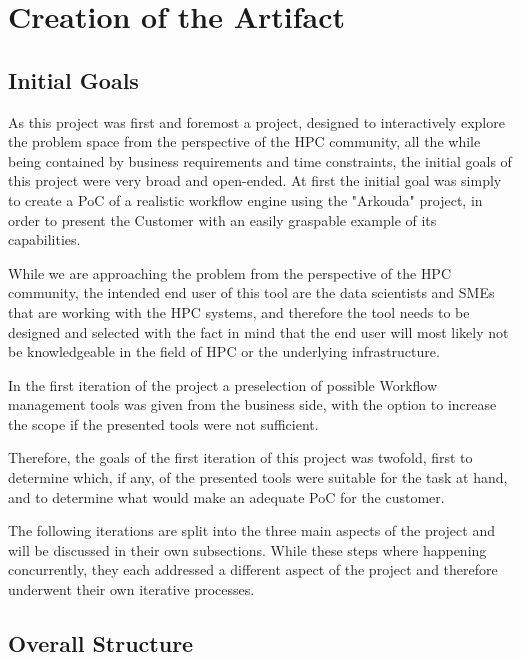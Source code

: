 \chapter{Creation of the Artifact}
\label{creation_of_the_artifact}

\section{Initial Goals}
\label{artefact_inital_goals}

As this project was first and foremost a project, designed to interactively explore the problem space from the perspective of the \ac{HPC} community, 
all the while being contained by business requirements and time constraints, the initial goals of this project were very broad and open-ended. 
At first the initial goal was simply to create a \ac{PoC} of a realistic workflow engine using the "Arkouda" project,
in order to present the Customer with an easily graspable example of its capabilities.

While we are approaching the problem from the perspective of the \ac{HPC} community, the intended end user of this tool are the data scientists and \acp{SME}
that are working with the \ac{HPC} systems, and therefore the tool needs to be designed and selected with the fact in mind that the end user will most likely not be knowledgeable in the field of \ac{HPC} or the underlying infrastructure.

In the first iteration of the project a preselection of possible Workflow management tools was given from the business side,
with the option to increase the scope if the presented tools were not sufficient.

Therefore, the goals of the first iteration of this project was twofold, first to determine which, if any, of the presented tools were suitable for the task at hand,
and to determine what would make an adequate \ac{PoC} for the customer.

The following iterations are split into the three main aspects of the project and will be discussed in their own subsections.
While these steps where happening concurrently, they each addressed a different aspect of the project and therefore underwent their own iterative processes.


\section{Overall Structure}
 
